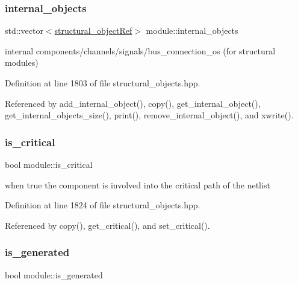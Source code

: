 \subsubsection{\texorpdfstring{internal\+\_\+objects}{internal\_objects}}
{\footnotesize\ttfamily std\+::vector$<$\hyperlink{structural__objects_8hpp_a8ea5f8cc50ab8f4c31e2751074ff60b2}{structural\+\_\+object\+Ref}$>$ module\+::internal\+\_\+objects\hspace{0.3cm}{\ttfamily [private]}}



internal components/channels/signals/bus\+\_\+connection\+\_\+os (for structural modules) 



Definition at line 1803 of file structural\+\_\+objects.\+hpp.



Referenced by add\+\_\+internal\+\_\+object(), copy(), get\+\_\+internal\+\_\+object(), get\+\_\+internal\+\_\+objects\+\_\+size(), print(), remove\+\_\+internal\+\_\+object(), and xwrite().

\mbox{\label{classmodule_a9bcfc24acd3410da8f3a70ec7c4d5799}} 
\subsubsection{\texorpdfstring{is\+\_\+critical}{is\_critical}}
{\footnotesize\ttfamily bool module\+::is\+\_\+critical\hspace{0.3cm}{\ttfamily [private]}}



when true the component is involved into the critical path of the netlist 



Definition at line 1824 of file structural\+\_\+objects.\+hpp.



Referenced by copy(), get\+\_\+critical(), and set\+\_\+critical().

\mbox{\label{classmodule_a0ef4678f8b3d4e9e15d97b7b6664a540}} 
\subsubsection{\texorpdfstring{is\+\_\+generated}{is\_generated}}
{\footnotesize\ttfamily bool module\+::is\+\_\+generated\hspace{0.3cm}{\ttfamily [private]}}



